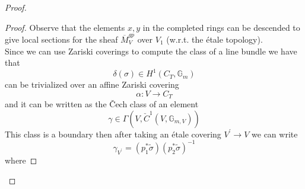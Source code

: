 \documentclass{amsart}
\theoremstyle{definition}
\numberwithin{equation}{section}
\begin{document}
\begin{proof}
\begin{proof}
Observe that the elements $x,y$ in the completed rings can be descended to give local sections for the sheaf $\overline{M}_{V}^{gp}$ over $V_1$ (w.r.t. the \'etale topology).\\

\noindent Since we can use Zariski coverings to compute the class of a line bundle we have that
$$
\delta(\sigma)\in H^1(C_T,\mathbb{G}_m)
$$
\noindent can be trivialized over an affine Zariski covering
$$
\alpha:V{\rightarrow} C_T
$$
\noindent and it can be written as the \v{C}ech class of an element
$$
\gamma\in \Gamma(V,\check{C}^1(V,\mathbb{G}_{m,V}))
$$
\noindent This class is a boundary then after taking an \'etale covering $V^{\prime}{\rightarrow} V$ we can write 
$$
\gamma_{V^{\prime}}= (p_1^{*}\tilde{\sigma})(p_2^{*}\tilde{\sigma})^{-1}
$$
\noindent where 
 

\end{proof}
\end{proof}
\end{document}
